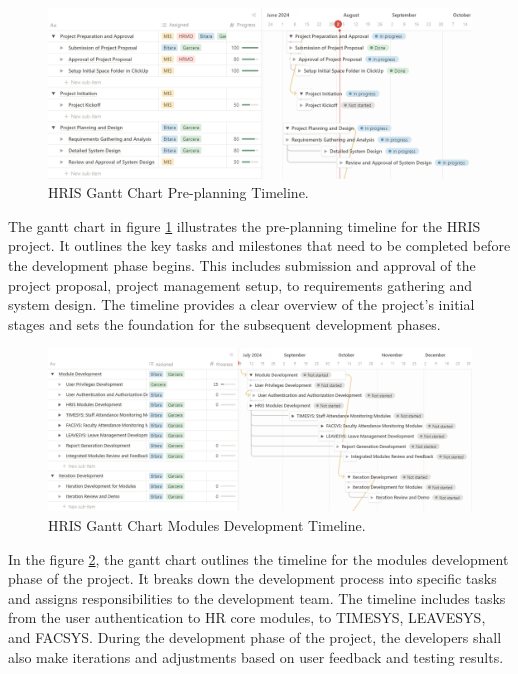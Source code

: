     \begin{figure}[H]
        \centering
        \includegraphics[width=1\linewidth]{figures/images/gantt-chart-1.png}
        \caption{HRIS Gantt Chart Pre-planning Timeline.}
        \label{fig:gantt-chart-1}
    \end{figure}

    The gantt chart in figure \ref{fig:gantt-chart-1} illustrates the pre-planning timeline for the HRIS project. It outlines the key tasks and milestones that need to be completed before the development phase begins. This includes submission and approval of the project proposal, project management setup, to requirements gathering and system design. The timeline provides a clear overview of the project's initial stages and sets the foundation for the subsequent development phases.

    \begin{figure}[H]
        \centering
        \includegraphics[width=1\linewidth]{figures/images/gantt-chart-2.png}
        \caption{HRIS Gantt Chart Modules Development Timeline.}
        \label{fig:gantt-chart-2}
    \end{figure}

    In the figure \ref{fig:gantt-chart-2}, the gantt chart outlines the timeline for the modules development phase of the project. It breaks down the development process into specific tasks and assigns responsibilities to the development team. The timeline includes tasks from the user authentication to HR core modules, to TIMESYS, LEAVESYS, and FACSYS. During the development phase of the project, the developers shall also make iterations and adjustments based on user feedback and testing results.

